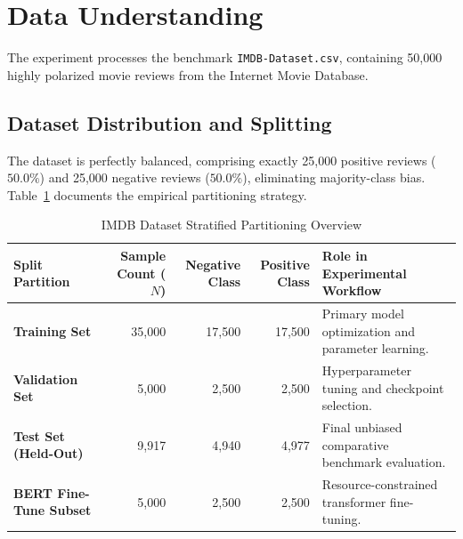 \section{Data Understanding}
The experiment processes the benchmark \texttt{IMDB-Dataset.csv}, containing 50,000 highly polarized movie reviews from the Internet Movie Database.

\subsection{Dataset Distribution and Splitting}
The dataset is perfectly balanced, comprising exactly 25,000 positive reviews ($50.0\%$) and 25,000 negative reviews ($50.0\%$), eliminating majority-class bias. Table~\ref{tab:exp7_data_splits} documents the empirical partitioning strategy.
\begin{table}[H]
\centering
\small
\caption{IMDB Dataset Stratified Partitioning Overview}
\label{tab:exp7_data_splits}
\begin{tabular}{lrrrp{6cm}}
\toprule
\textbf{Split Partition} & \textbf{Sample Count ($N$)} & \textbf{Negative Class} & \textbf{Positive Class} & \textbf{Role in Experimental Workflow} \\
\midrule
\textbf{Training Set} & 35,000 & 17,500 & 17,500 & Primary model optimization and parameter learning. \\
\textbf{Validation Set} & 5,000 & 2,500 & 2,500 & Hyperparameter tuning and checkpoint selection. \\
\textbf{Test Set (Held-Out)} & 9,917 & 4,940 & 4,977 & Final unbiased comparative benchmark evaluation. \\
\midrule
\textbf{BERT Fine-Tune Subset} & 5,000 & 2,500 & 2,500 & Resource-constrained transformer fine-tuning. \\
\bottomrule
\end{tabular}
\end{table}

